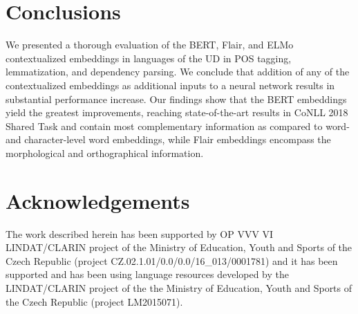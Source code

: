 \documentclass[11pt,a4paper]{article}
\begin{document}
\section{Conclusions}

We presented a thorough evaluation of the BERT, Flair, and ELMo contextualized
embeddings in  languages of the UD in POS tagging, lemmatization, and
dependency parsing. We conclude that addition of any of the contextualized
embeddings as additional inputs to a neural network results in substantial
performance increase. Our findings show that the BERT embeddings yield the
greatest improvements, reaching state-of-the-art results in CoNLL 2018 Shared
Task
and contain most complementary information
as compared to word- and character-level word embeddings,
while Flair
embeddings encompass the morphological and orthographical information.

\section*{Acknowledgements}

The work described herein has been supported by OP VVV VI LINDAT/CLARIN project
of the Ministry of Education, Youth and Sports of the Czech Republic (project
CZ.02.1.01/0.0/0.0/16\_013/0001781) and it has been supported and has been
using language resources developed by the LINDAT/CLARIN project of the the
Ministry of Education, Youth and Sports of the Czech Republic (project
LM2015071).



\end{document}

